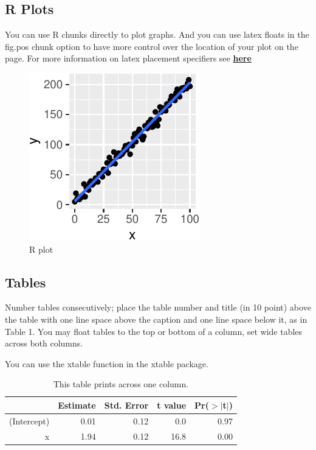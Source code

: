 \documentclass[10pt, letterpaper]{article}
\newenvironment{CodeChunk}{}{}
\begin{document}
\hypertarget{r-plots}{%
\subsection{R Plots}\label{r-plots}}

You can use R chunks directly to plot graphs. And you can use latex
floats in the fig.pos chunk option to have more control over the
location of your plot on the page. For more information on latex
placement specifiers see
\textbf{\href{https://en.wikibooks.org/wiki/LaTeX/Floats,_Figures_and_Captions}{here}}

\begin{CodeChunk}
\begin{figure}[H]

{\centering \includegraphics{figs/plot-1} 

}

\caption[R plot]{R plot}\label{fig:plot}
\end{figure}
\end{CodeChunk}

\hypertarget{tables}{%
\subsection{Tables}\label{tables}}

Number tables consecutively; place the table number and title (in 10
point) above the table with one line space above the caption and one
line space below it, as in Table 1. You may float tables to the top or
bottom of a column, set wide tables across both columns.

You can use the xtable function in the xtable package.

\begin{table}[H]
\centering
\begin{tabular}{rrrrr}
  \hline
 & Estimate & Std. Error & t value & Pr($>$$|$t$|$) \\ 
  \hline
(Intercept) & 0.01 & 0.12 & 0.0 & 0.97 \\ 
  x & 1.94 & 0.12 & 16.8 & 0.00 \\ 
   \hline
\end{tabular}
\caption{This table prints across one column.} 
\end{table}
\end{document}
